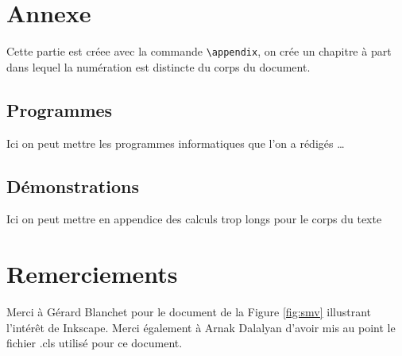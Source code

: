 \chapter{Annexe}
Cette partie est créee avec la commande \lstinline+\appendix+, 
on crée un chapitre à part dans lequel la numération est distincte du corps du document.
\section{Programmes}
Ici on peut mettre les programmes informatiques que l'on a rédigés \ldots
\section{Démonstrations }
Ici on peut mettre en appendice des calculs trop longs pour le corps du texte

\chapter{Remerciements}
Merci \`a G\'erard Blanchet pour le document  de la Figure \ref{fig:smv}
illustrant l'intérêt de Inkscape. Merci \'egalement \`a Arnak Dalalyan
d'avoir mis au point le fichier .cls utilisé pour ce document.